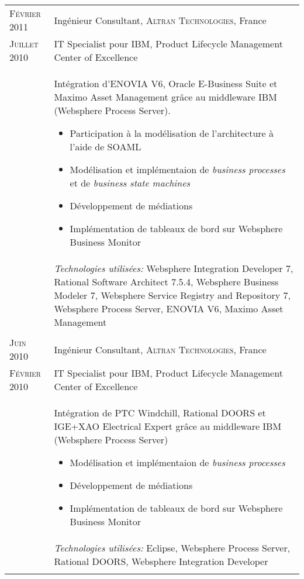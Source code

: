 \begin{longtable}{R{2.5cm}|p{14.8cm}}
 	\textsc{Février 2011} & Ingénieur Consultant, \textsc{Altran Technologies}, France\\
 	\textsc{Juillet 2010}&IT Specialist pour IBM, Product Lifecycle Management Center of Excellence\\&
 	\footnotesize{
 		Intégration d'ENOVIA V6, Oracle E-Business Suite et Maximo Asset Management grâce au middleware IBM (Websphere Process Server).
 	 	\begin{itemize}
			\item Participation à la modélisation de l'architecture à l'aide de SOAML
			\item Modélisation et implémentaion de \emph{business processes} et de \emph{business state machines}
			\item Développement de médiations
			\item Implémentation de tableaux de bord sur Websphere Business Monitor
		\end{itemize}
		\vspace{-1em}
 	}\\&
 	\footnotesize{\emph{Technologies utilisées:} Websphere Integration Developer 7, Rational Software Architect 7.5.4, Websphere Business Modeler 7, Websphere Service Registry and Repository 7, 
 	Websphere Process Server, ENOVIA V6, Maximo Asset Management }\\
  \\
 	\textsc{Juin 2010} & Ingénieur Consultant, \textsc{Altran Technologies}, France\\
 	\textsc{Février 2010}&IT Specialist pour IBM, Product Lifecycle Management Center of Excellence\\&
 	\footnotesize{
 		Intégration de PTC Windchill, Rational DOORS et IGE+XAO Electrical Expert grâce au middleware IBM (Websphere Process Server)
 		\begin{itemize}
			\item Modélisation et implémentaion de \emph{business processes}
			\item Développement de médiations
			\item Implémentation de tableaux de bord sur Websphere Business Monitor
		\end{itemize}
		\vspace{-1em}
 	}\\&
 	\footnotesize{\emph{Technologies utilisées:} Eclipse, Websphere Process Server, Rational DOORS, Websphere Integration Developer }\\
  \\

\end{longtable}
